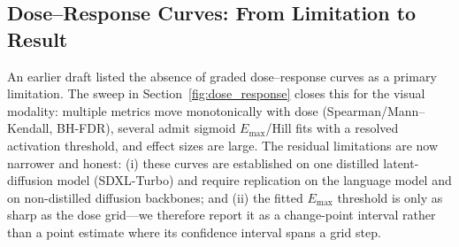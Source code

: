 \begin{table}[t]
    \centering
    \caption{\textbf{Monotonicity and effect sizes} across dose (BH-FDR over metrics $\times$ packs).
    Pilot values (N=16); \textbf{replace with N=100}. $\rho$: Spearman; $q$: FDR-adjusted $p$;
    $d$: Cohen's $d$ (dose~1.0 vs.\ baseline). Direction pre-registered.}
    \label{tab:dose_response}
\end{table}


\subsection{Dose--Response Curves: From Limitation to Result}
An earlier draft listed the absence of graded dose--response curves as a primary limitation. The
sweep in Section~\ref{fig:dose_response} closes this for the visual modality: multiple metrics move
monotonically with dose (Spearman/Mann--Kendall, BH-FDR), several admit sigmoid $E_{\max}$/Hill fits
with a resolved activation threshold, and effect sizes are large. The residual limitations are now
narrower and honest: (i) these curves are established on one distilled latent-diffusion model
(SDXL-Turbo) and require replication on the language model and on non-distilled diffusion backbones;
and (ii) the fitted $E_{\max}$ threshold is only as sharp as the dose grid---we therefore report it as
a change-point interval rather than a point estimate where its confidence interval spans a grid step.


